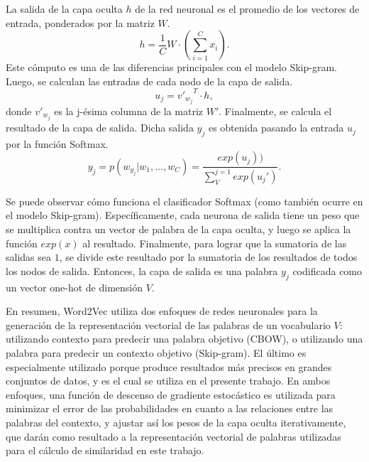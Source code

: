 \bigskip La salida de la capa oculta \(h\) de la red neuronal es el promedio de los vectores de entrada, ponderados por la matriz \(W\).
\[h = \frac{1}{C}W \cdot (\sum_{i=1}^{C}{x_i}).\]
Este cómputo es una de las diferencias principales con el modelo Skip-gram. Luego, se calculan las entradas de cada nodo de la capa de salida.
\[u_j = {v'_{w_j}}^{T} \cdot h,\]
donde \(v'_{w_j}\) es la j-ésima columna de la matriz \(W'\). Finalmente, se calcula el resultado de la capa de salida. Dicha salida \(y_j\) es obtenida pasando la entrada \(u_j\) por la función Softmax.
\[y_j=p(w_{y_j}|w_1,...,w_C)=\frac{exp(u_j))}{\sum_{V}^{j=1}exp(u_j')}.\]

\bigskip Se puede observar cómo funciona el clasificador Softmax (como también ocurre en el modelo Skip-gram). Específicamente, cada neurona de salida tiene un peso que se multiplica contra un vector de palabra de la capa oculta, y luego se aplica la función \(exp(x)\) al resultado. Finalmente, para lograr que la sumatoria de las salidas sea \(1\), se divide este resultado por la sumatoria de los resultados de todos los nodos de salida. Entonces, la capa de salida es una palabra \(y_j\) codificada como un vector one-hot de dimensión \(V\).

\bigskip En resumen, Word2Vec utiliza dos enfoques de redes neuronales para la generación de la representación vectorial de las palabras de un vocabulario \(V\): utilizando contexto para predecir una palabra objetivo (CBOW), o utilizando una palabra para predecir un contexto objetivo (Skip-gram). El último es especialmente utilizado porque produce resultados más precisos en grandes conjuntos de datos, y es el cual se utiliza en el presente trabajo. En ambos enfoques, una función de descenso de gradiente estocástico es utilizada para minimizar el error de las probabilidades en cuanto a las relaciones entre las palabras del contexto, y ajustar así los pesos de la capa oculta iterativamente, que darán como resultado a la representación vectorial de palabras utilizadas para el cálculo de similaridad en este trabajo.


